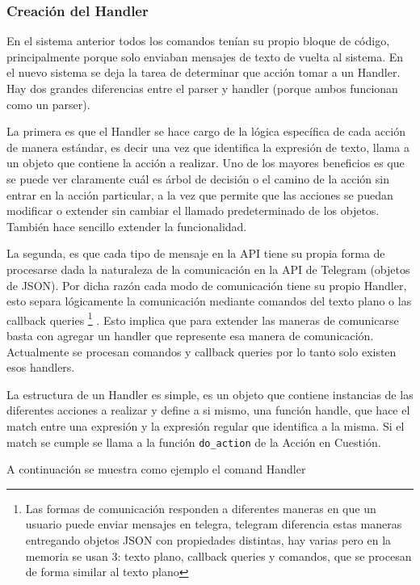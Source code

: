     \subsubsection{Creación del Handler}
        \par En el sistema anterior todos los comandos tenían su propio bloque de código, principalmente porque solo enviaban mensajes de texto de vuelta al sistema. En el nuevo sistema se deja la tarea de determinar que acción tomar a un Handler. Hay dos grandes diferencias entre el parser y handler (porque ambos funcionan como un parser).
        \par La primera es que el Handler se hace cargo de la lógica específica de cada acción de manera estándar, es decir una vez que identifica la expresión de texto, llama a un objeto que contiene la acción a realizar. Uno de los mayores beneficios es que se puede ver claramente cuál es árbol de decisión o el camino de la acción sin entrar en la acción particular, a la vez que permite que las acciones se puedan modificar o extender sin cambiar el llamado predeterminado de los objetos. También hace sencillo extender la funcionalidad. 
        \par La segunda, es que cada tipo de mensaje en la API tiene su propia forma de procesarse dada la naturaleza de la comunicación en la API de Telegram (objetos de JSON). Por dicha razón cada modo de comunicación tiene su propio Handler, esto separa lógicamente la comunicación mediante comandos del texto plano o las callback queries \footnote{Las formas de comunicación responden a diferentes maneras en que un usuario puede enviar mensajes en telegra, telegram diferencia estas maneras entregando objetos JSON con propiedades distintas, hay varias pero en la memoria se usan 3: texto plano, callback queries y comandos, que se procesan de forma similar al texto plano} . Esto implica que para extender las maneras de comunicarse basta con agregar un handler que represente esa manera de comunicación. Actualmente se procesan comandos y callback queries por lo tanto solo existen esos handlers.
        \par La estructura de un Handler es simple, es un objeto que contiene instancias de las diferentes acciones a realizar y define a si mismo, una función handle, que hace el match entre una expresión y la expresión regular que identifica a la misma. Si el match se cumple se llama a la función \texttt{do_action} de la Acción en Cuestión.

        \par A continuación se muestra como ejemplo el comand Handler

